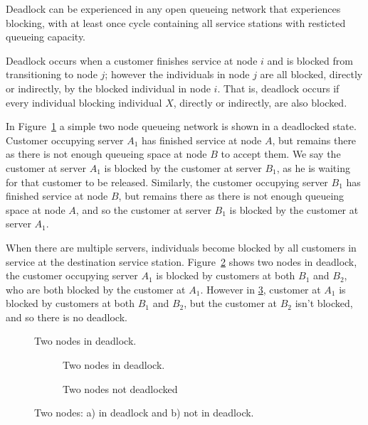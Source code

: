 \documentclass{article}
\begin{document}
Deadlock can be experienced in any open queueing network that experiences
blocking, with at least once cycle containing all service stations with
resticted queueing capacity.

Deadlock occurs when a customer finishes service at node $i$ and is blocked from transitioning to node $j$; however the individuals in node $j$ are all blocked, directly or indirectly, by the blocked individual in node $i$.
That is, deadlock occurs if every individual blocking individual $X$, directly or indirectly, are also blocked.

In Figure~\ref{fig:2in_deadlock} a simple two node queueing network is shown in a deadlocked state.
Customer occupying server $A_1$ has finished service at node $A$, but remains there as there is not
enough queueing space at node $B$ to accept them.
We say the customer at server $A_1$ is blocked by the customer at server $B_1$, as he is waiting for that customer to be released.
Similarly, the customer occupying server $B_1$ has finished service at node $B$, but remains there as there is not enough queueing space at node $A$, and so the customer at server $B_1$ is blocked by the customer at server $A_1$.

When there are multiple servers, individuals become blocked by all customers in
service at the destination service station.
Figure~\ref{fig:inout_deadlock_in} shows two nodes in deadlock, the customer occupying server $A_1$ is blocked by customers at both $B_1$ and $B_2$, who are both blocked by the customer at $A_1$.
However in \ref{fig:inout_deadlock_out}, customer at $A_1$ is blocked by customers at both $B_1$ and $B_2$, but the customer at $B_2$ isn't blocked, and so there is no deadlock.

\begin{figure}[H]
  \begin{center}
  
  \caption{Two nodes in deadlock.}
  \label{fig:2in_deadlock}
  \end{center}
\end{figure}

\begin{figure}[H]
\begin{subfigure}[b]{0.5\textwidth}
  
  \caption{Two nodes in deadlock.}
  \label{fig:inout_deadlock_in}
\end{subfigure}
\begin{subfigure}[b]{0.5\textwidth}
  
  \caption{Two nodes not deadlocked}
  \label{fig:inout_deadlock_out}
\end{subfigure}
\caption{Two nodes: a) in deadlock and b) not in deadlock.}
\label{fig:inout_deadlock}
\end{figure}
\end{document}
